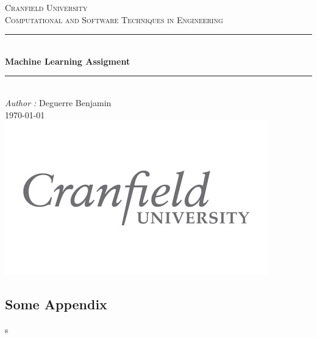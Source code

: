 \documentclass[a4paper, 11pt]{article}
\newcommand{\HRule}{\rule{\linewidth}{0.5mm}} %
\begin{document}
	\begin{titlepage}


		\center %

    \vspace*{4cm}
		\textsc{\LARGE Cranfield University}\\[1.5cm] %
		\textsc{\Large Computational and Software Techniques in Engineering}\\[0.5cm]
    \HRule \\[0.4cm]
		{ \huge \bfseries Machine Learning Assigment}\\[0.4cm] %
		\HRule \\[1.5cm]

    {\large \emph{Author :} Deguerre Benjamin}\\[1cm]
		{\large \today}\\[1cm] %

    \vfill %
		\includegraphics{logo}\\[1cm] %




	\end{titlepage}

\setcounter{page}{1}
\tableofcontents




\newpage


\newpage


\newpage


\newpage


\newpage


\newpage


\newpage


\newpage

\begin{appendices}
\section{Some Appendix}
\end{appendices}s
\end{document}

